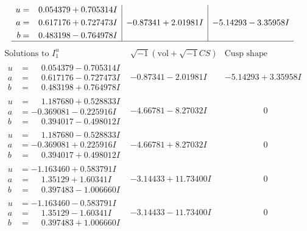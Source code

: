 \documentclass[1p]{elsarticle_modified}
\theoremstyle{definition}
\newcommand{\I}{\sqrt{-1}}
\begin{document}
$$\begin{array}{c|c|c}
\begin{aligned}
u &= \phantom{-}0.054379 + 0.705314 I \\
a &= \phantom{-}0.617176 + 0.727473 I \\
b &= \phantom{-}0.483198 - 0.764978 I\end{aligned}
 & -0.87341 + 2.01981 I & -5.14293 - 3.35958 I\\
 \hline 
 \end{array}$$\newpage$$\begin{array}{c|c|c}  
\text{Solutions to }I^u_{1}& \I (\text{vol} + \sqrt{-1}CS) & \text{Cusp shape}\\
 \hline 
\begin{aligned}
u &= \phantom{-}0.054379 - 0.705314 I \\
a &= \phantom{-}0.617176 - 0.727473 I \\
b &= \phantom{-}0.483198 + 0.764978 I\end{aligned}
 & -0.87341 - 2.01981 I & -5.14293 + 3.35958 I \\ \hline\begin{aligned}
u &= \phantom{-}1.187680 + 0.528833 I \\
a &= -0.369081 - 0.225916 I \\
b &= \phantom{-}0.394017 - 0.498012 I\end{aligned}
 & -4.66781 - 8.27032 I & \phantom{-0.000000 } 0 \\ \hline\begin{aligned}
u &= \phantom{-}1.187680 - 0.528833 I \\
a &= -0.369081 + 0.225916 I \\
b &= \phantom{-}0.394017 + 0.498012 I\end{aligned}
 & -4.66781 + 8.27032 I & \phantom{-0.000000 } 0 \\ \hline\begin{aligned}
u &= -1.163460 + 0.583791 I \\
a &= \phantom{-}1.35129 + 1.60341 I \\
b &= \phantom{-}0.397483 - 1.006660 I\end{aligned}
 & -3.14433 + 11.73400 I & \phantom{-0.000000 } 0 \\ \hline\begin{aligned}
u &= -1.163460 - 0.583791 I \\
a &= \phantom{-}1.35129 - 1.60341 I \\
b &= \phantom{-}0.397483 + 1.006660 I\end{aligned}
 & -3.14433 - 11.73400 I & \phantom{-0.000000 } 0 \\ \hline\begin{aligned}

\end{aligned}
\end{array}$$
\end{document}
